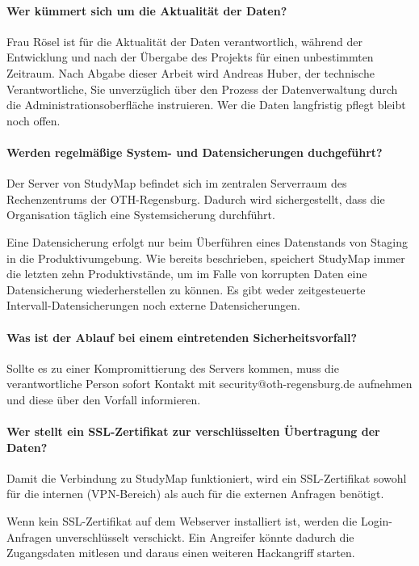 \paragraph*{Wer kümmert sich um die Aktualität der Daten?}
Frau Rösel ist für die Aktualität der Daten verantwortlich, während der Entwicklung und nach der Übergabe des Projekts für einen unbestimmten Zeitraum. Nach Abgabe dieser Arbeit wird Andreas Huber, der technische Verantwortliche, Sie unverzüglich über den Prozess der Datenverwaltung durch die Administrationsoberfläche instruieren. Wer die Daten langfristig pflegt bleibt noch offen.

\paragraph*{Werden regelmäßige System- und Datensicherungen duchgeführt?}
Der Server von StudyMap befindet sich im zentralen Serverraum des Rechenzentrums der OTH-Regensburg. Dadurch wird sichergestellt, dass die Organisation täglich eine Systemsicherung durchführt.

Eine Datensicherung erfolgt nur beim Überführen eines Datenstands von Staging in die Produktivumgebung. Wie bereits beschrieben, speichert StudyMap immer die letzten zehn Produktivstände, um im Falle von korrupten Daten eine Datensicherung wiederherstellen zu können. Es gibt weder zeitgesteuerte Intervall-Datensicherungen noch externe Datensicherungen.

\paragraph*{Was ist der Ablauf bei einem eintretenden Sicherheitsvorfall?}
Sollte es zu einer Kompromittierung des Servers kommen, muss die verantwortliche Person sofort Kontakt mit security@oth-regensburg.de aufnehmen und diese über den Vorfall informieren.

\paragraph*{Wer stellt ein SSL-Zertifikat zur verschlüsselten Übertragung der Daten?}
Damit die Verbindung zu StudyMap funktioniert, wird ein SSL-Zertifikat sowohl für die internen (VPN-Bereich) als auch für die externen Anfragen benötigt.

Wenn kein SSL-Zertifikat auf dem Webserver installiert ist, werden die Login-Anfragen unverschlüsselt verschickt. Ein Angreifer könnte dadurch die Zugangsdaten mitlesen und daraus einen weiteren Hackangriff starten.

